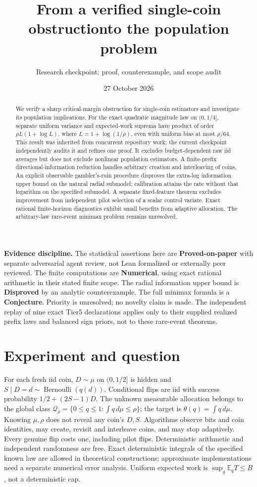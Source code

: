 \documentclass[11pt]{article}
\title{From a verified single-coin obstruction\newline to the population problem}
\author{Research checkpoint: proof, counterexample, and scope audit}
\date{27 October 2026}
\newcommand{\E}{\mathbb E}
\begin{document}
\maketitle
\begin{abstract}
We verify a sharp critical-margin obstruction for single-coin estimators
and investigate its population implications. For the exact quadratic
magnitude law on $(0,1/4]$, separate uniform variance and expected-work
suprema have product of order $\rho L(1+\log L)$, where
$L=1+\log(1/\rho)$, even with uniform bias at most $\rho/64$.
This result was inherited from concurrent repository work; the current
checkpoint independently audits it and refines one proof. It excludes
budget-dependent raw iid averages but does not exclude nonlinear population
estimators. A finite-prefix directional-information reduction handles
arbitrary creation and interleaving of coins. An explicit observable
gambler's-ruin procedure disproves the extra-log information upper bound
on the natural radial submodel; calibration attains the rate without that
logarithm on the specified submodel. A separate fixed-feature theorem
excludes improvement from independent pilot selection of a scalar control
variate. Exact rational finite-horizon diagnostics exhibit small benefits
from adaptive allocation. The arbitrary-law rare-event minimax problem
remains unresolved.
\end{abstract}

\noindent\textbf{Evidence discipline.}
The statistical assertions here are \textbf{Proved-on-paper} with separate
adversarial agent review, not Lean formalized or externally peer reviewed.
The finite computations are \textbf{Numerical}, using exact rational
arithmetic in their stated finite scope. The radial information upper
bound is \textbf{Disproved} by an analytic counterexample. The full minimax
formula is a \textbf{Conjecture}. Priority is unresolved; no novelty claim
is made. The independent replay of nine exact Tier5 declarations applies
only to their supplied realized prefix laws and balanced sign priors, not
to these rare-event theorems.

\section{Experiment and question}
For each fresh iid coin, $D\sim\mu$ on $(0,1/2]$ is hidden and
$S\mid D=d\sim\operatorname{Bernoulli}(q(d))$. Conditional flips are iid
with success probability $1/2+(2S-1)D$. The unknown measurable allocation
belongs to the global class
$\mathcal Q_\rho=\{0\le q\le1:\int q\,d\mu\le\rho\}$;
the target is $\theta(q)=\int q\,d\mu$. Knowing $\mu,\rho$ does not reveal
any coin's $D,S$. Algorithms observe bits and coin identities, may create,
revisit and interleave coins, and may stop adaptively. Every genuine flip
costs one, including pilot flips. Deterministic arithmetic and independent
randomness are free. Exact deterministic integrals of the specified known
law are allowed in theoretical constructions; approximate implementations
need a separate numerical error analysis. Uniform expected work is
$\sup_q\E_qT\le B$, not a deterministic cap.
\end{document}
